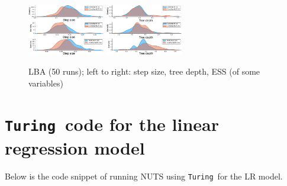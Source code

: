 \documentclass[tablecaption=bottom,wcp]{jmlr} %
\def\turing{\texttt{Turing}}
\begin{document}
\begin{figure}[h!]
    \includegraphics[width=0.3\textwidth]{images/LBA/density_epsilon.pdf}
    \includegraphics[width=0.3\textwidth]{images/LBA/density_tree_depth.pdf}
    \;\hfill
    \hfill\;
    \caption{LBA (50 runs); left to right: step size, tree depth, ESS (of some variables)}
    \label{fig:lba}
\end{figure}

\section{\turing~code for the linear regression model}
\label{app:turing-lr}
Below is the code snippet of running NUTS using \turing~for the LR model.

\end{document}
